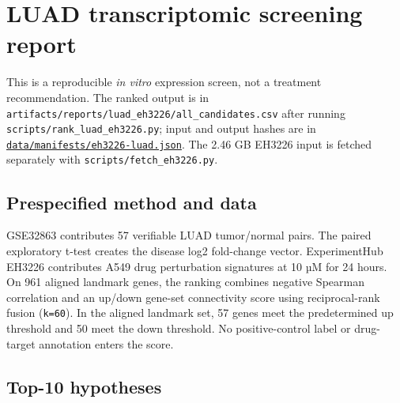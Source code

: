 \documentclass[
  10pt,
]{ctexart}
\author{}
\date{}
\begin{document}
\section{LUAD transcriptomic screening
report}\label{luad-transcriptomic-screening-report}

This is a reproducible \emph{in vitro} expression screen, not a
treatment recommendation. The ranked output is in
\texttt{artifacts/\allowbreak{}reports/\allowbreak{}luad\_\allowbreak{}eh3226/\allowbreak{}all\_\allowbreak{}candidates.\allowbreak{}csv} after
running \texttt{scripts/\allowbreak{}rank\_\allowbreak{}luad\_\allowbreak{}eh3226.\allowbreak{}py}; input and output hashes
are in
\href{../data/manifests/eh3226-luad.json}{\texttt{data/\allowbreak{}manifests/\allowbreak{}eh3226-luad.\allowbreak{}json}}.
The 2.46 GB EH3226 input is fetched separately with
\texttt{scripts/\allowbreak{}fetch\_\allowbreak{}eh3226.\allowbreak{}py}.

\subsection{Prespecified method and
data}\label{prespecified-method-and-data}

GSE32863 contributes 57 verifiable LUAD tumor/normal pairs. The paired
exploratory t-test creates the disease log2 fold-change vector.
ExperimentHub EH3226 contributes A549 drug perturbation signatures at 10
µM for 24 hours. On 961 aligned landmark genes, the ranking combines
negative Spearman correlation and an up/down gene-set connectivity score
using reciprocal-rank fusion (\texttt{k=60}). In the aligned landmark
set, 57 genes meet the predetermined up threshold and 50 meet the down
threshold. No positive-control label or drug-target annotation enters
the score.

\subsection{Top-10 hypotheses}\label{top-10-hypotheses}
\end{document}
